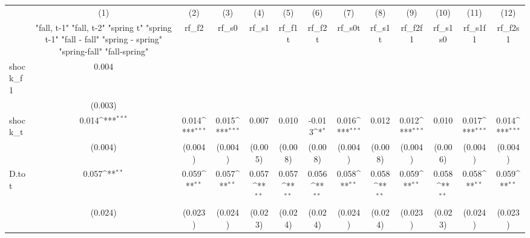 {
\def\sym#1{\ifmmode^{#1}\else\(^{#1}\)\fi}
\begin{tabular}{l*{12}{c}}
\toprule
            &\multicolumn{1}{c}{(1)}&\multicolumn{1}{c}{(2)}&\multicolumn{1}{c}{(3)}&\multicolumn{1}{c}{(4)}&\multicolumn{1}{c}{(5)}&\multicolumn{1}{c}{(6)}&\multicolumn{1}{c}{(7)}&\multicolumn{1}{c}{(8)}&\multicolumn{1}{c}{(9)}&\multicolumn{1}{c}{(10)}&\multicolumn{1}{c}{(11)}&\multicolumn{1}{c}{(12)}\\
            &\multicolumn{1}{c}{  "fall, t-1" "fall, t-2" "spring t" "spring t-1"  "fall - fall" "spring - spring" "spring-fall" "fall-spring" }&\multicolumn{1}{c}{rf\_f2}&\multicolumn{1}{c}{rf\_s0}&\multicolumn{1}{c}{rf\_s1}&\multicolumn{1}{c}{rf\_f1t}&\multicolumn{1}{c}{rf\_f2t}&\multicolumn{1}{c}{rf\_s0t}&\multicolumn{1}{c}{rf\_s1t}&\multicolumn{1}{c}{rf\_f2f1}&\multicolumn{1}{c}{rf\_s1s0}&\multicolumn{1}{c}{rf\_s1f1}&\multicolumn{1}{c}{rf\_f2s1}\\
\midrule
shock\_f1    &       0.004         &                     &                     &                     &                     &                     &                     &                     &                     &                     &                     &                     \\
            &     (0.003)         &                     &                     &                     &                     &                     &                     &                     &                     &                     &                     &                     \\
\addlinespace
shock\_t     &       0.014\sym{***}&       0.014\sym{***}&       0.015\sym{***}&       0.007         &       0.010         &      -0.013\sym{*}  &       0.016\sym{***}&       0.012         &       0.012\sym{***}&       0.010         &       0.017\sym{***}&       0.014\sym{***}\\
            &     (0.004)         &     (0.004)         &     (0.004)         &     (0.005)         &     (0.008)         &     (0.008)         &     (0.004)         &     (0.008)         &     (0.004)         &     (0.006)         &     (0.004)         &     (0.004)         \\
\addlinespace
D.tot       &       0.057\sym{**} &       0.059\sym{**} &       0.057\sym{**} &       0.057\sym{**} &       0.057\sym{**} &       0.056\sym{**} &       0.058\sym{**} &       0.058\sym{**} &       0.059\sym{**} &       0.058\sym{**} &       0.058\sym{**} &       0.059\sym{**} \\
            &     (0.024)         &     (0.023)         &     (0.024)         &     (0.023)         &     (0.024)         &     (0.024)         &     (0.024)         &     (0.024)         &     (0.023)         &     (0.023)         &     (0.024)         &     (0.023)         \\

\end{tabular}}
